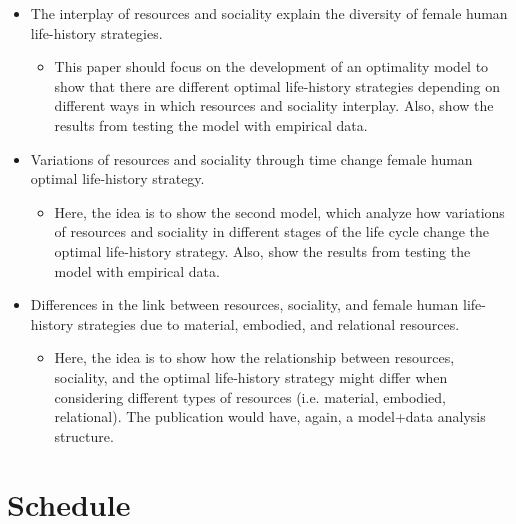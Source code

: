 \documentclass{article}
\begin{document}
\begin{itemize}
    \item The interplay of resources and sociality explain the diversity of female human life-history strategies.
    \begin{itemize}
        \item This paper should focus on the development of an optimality model to show that there are different optimal life-history strategies depending on different ways in which resources and sociality interplay. Also, show the results from testing the model with empirical data.
    \end{itemize}
    \item Variations of resources and sociality through time change female human optimal life-history strategy.
    \begin{itemize}
        \item Here, the idea is to show the second model, which analyze how variations of resources and sociality in different stages of the life cycle change the optimal life-history strategy. Also, show the results from testing the model with empirical data.
    \end{itemize}
    \item Differences in the link between resources, sociality, and female human life-history strategies due to material, embodied, and relational resources.
    \begin{itemize}
        \item Here, the idea is to show how the relationship between resources, sociality, and the optimal life-history strategy might differ when considering different types of resources (i.e. material, embodied, relational). The publication would have, again, a model+data analysis structure.
    \end{itemize}
\end{itemize}

\section{Schedule}
\end{document}
